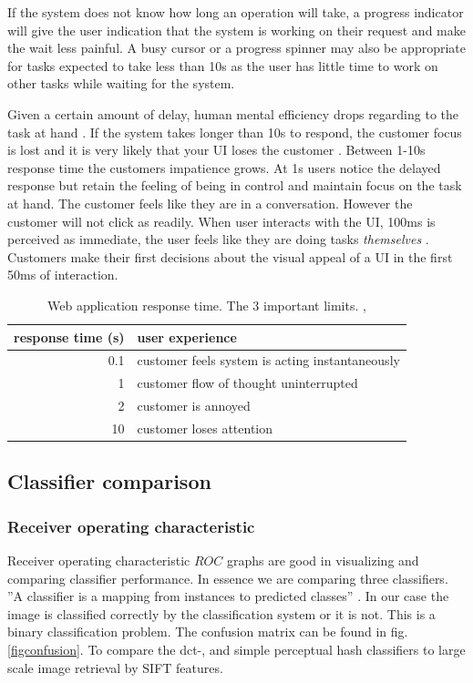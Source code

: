 \documentclass[english,12pt,a4paper,pdftex,elec,utf8]{aaltothesis}
\begin{document}
If the system does not know how long an operation will take, a progress indicator will give the user indication that the system is working on their request and make the wait less painful. A busy cursor or a progress spinner may also be appropriate for tasks expected to take less than 10s as the user has little time to work on other tasks while waiting for the system. \cite{Nielsen1993a}

Given a certain amount of delay, human mental efficiency drops regarding to the task at hand \cite{Miller1968}. If the system takes longer than 10s to respond, the customer focus is lost and it is very likely that your UI loses the customer \cite{Nielsen1993a}. Between 1-10s response time the customers impatience grows. At 1s users notice the delayed response but retain the feeling of being in control and maintain focus on the task at hand. The customer feels like they are in a conversation. However the customer will not click as readily. When user interacts with the UI, 100ms is perceived as immediate, the user feels like they are doing tasks \emph{themselves} \cite{Nielsen2010}. Customers make their first decisions about the visual appeal of a UI in the first 50ms of interaction. \cite{Nielsen2010}

\def\arraystretch{1.5}
\begin{table}[htb]
\caption{Web application response time. The 3 important limits. \cite{Miller1968},\cite{Nielsen1993}}
\label{webresponsetimes}
\begin{center}
  \begin{tabular}{rl}
    \hline
  response time (s) & user experience\\
  \hline
  0.1 & customer feels system is acting instantaneously\\
  1 & customer flow of thought uninterrupted\\
  2 & customer is annoyed\\
  10 & customer loses attention\\
  \hline
\end{tabular}
\end{center}\end{table}

\subsection{Classifier comparison}
\subsubsection{Receiver operating characteristic}
Receiver operating characteristic \(ROC\) graphs are good in visualizing and comparing classifier performance. In essence we are comparing three classifiers. ''A classifier is a mapping from instances to predicted classes'' \cite{Fawcett2006}. In our case the image is classified correctly by the classification system or it is not. This is a binary classification problem. The confusion matrix can be found in fig. \ref{figconfusion}. To compare the dct-, and simple perceptual hash classifiers to large scale image retrieval by SIFT features.
\end{document}

